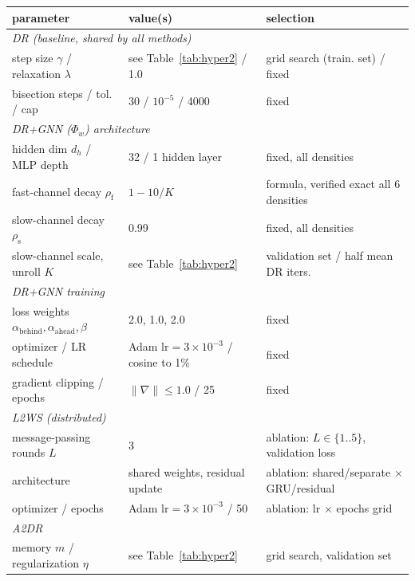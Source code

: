 
\begin{tabular}{llp{4.2cm}}
\toprule
parameter & value(s) & selection \\
\midrule
\multicolumn{3}{l}{\textit{DR (baseline, shared by all methods)}} \\
step size $\gamma$ / relaxation $\lambda$ & see Table~\ref{tab:hyper2} / 1.0 & grid search (train. set) / fixed \\
bisection steps / tol. / cap & 30 / $10^{-5}$ / 4000 & fixed \\
\multicolumn{3}{l}{\textit{DR+GNN ($\Phi_w$) architecture}} \\
hidden dim $d_h$ / MLP depth & 32 / 1 hidden layer & fixed, all densities \\
fast-channel decay $\rho_{\mathrm f}$ & $1-10/K$ & formula, verified exact all 6 densities \\
slow-channel decay $\rho_{\mathrm s}$ & 0.99 & fixed, all densities \\
slow-channel scale, unroll $K$ & see Table~\ref{tab:hyper2} & validation set / half mean DR iters. \\
\multicolumn{3}{l}{\textit{DR+GNN training}} \\
loss weights $\alpha_{\text{behind}},\alpha_{\text{ahead}},\beta$ & 2.0, 1.0, 2.0 & fixed \\
optimizer / LR schedule & Adam lr$=3\times10^{-3}$ / cosine to 1\% & fixed \\
gradient clipping / epochs & $\|\nabla\|\le 1.0$ / 25 & fixed \\
\multicolumn{3}{l}{\textit{L2WS (distributed)}} \\
message-passing rounds $L$ & 3 & ablation: $L\in\{1..5\}$, validation loss \\
architecture & shared weights, residual update & ablation: shared/separate $\times$ GRU/residual \\
optimizer / epochs & Adam lr$=3\times10^{-3}$ / 50 & ablation: lr $\times$ epochs grid \\
\multicolumn{3}{l}{\textit{A2DR}} \\
memory $m$ / regularization $\eta$ & see Table~\ref{tab:hyper2} & grid search, validation set \\
\bottomrule
\end{tabular}
